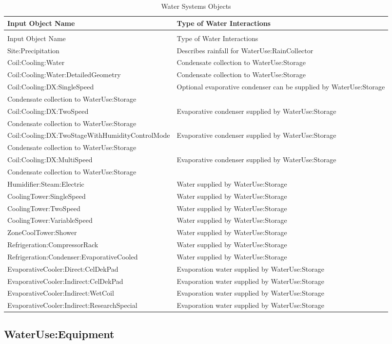 \begin{longtable}[c]{p{2.49in}p{3.5in}}
\caption{Water Systems Objects \label{table:water-systems-objects}} \tabularnewline
\toprule
Input Object Name & Type of Water Interactions \tabularnewline
\midrule
\endfirsthead

\caption[]{Water Systems Objects} \tabularnewline
\toprule
Input Object Name & Type of Water Interactions \tabularnewline
\midrule
\endhead

Site:Precipitation & Describes rainfall for WaterUse:RainCollector \tabularnewline
Coil:Cooling:Water & Condensate collection to WaterUse:Storage \tabularnewline
Coil:Cooling:Water:DetailedGeometry & Condensate collection to WaterUse:Storage \tabularnewline
Coil:Cooling:DX:SingleSpeed & Optional evaporative condenser can be supplied by WaterUse:Storage \tabularnewline
Condensate collection to WaterUse:Storage \tabularnewline
Coil:Cooling:DX:TwoSpeed & Evaporative condenser supplied by WaterUse:Storage \tabularnewline
Condensate collection to WaterUse:Storage \tabularnewline
Coil:Cooling:DX:TwoStageWithHumidityControlMode & Evaporative condenser supplied by WaterUse:Storage \tabularnewline
Condensate collection to WaterUse:Storage \tabularnewline
Coil:Cooling:DX:MultiSpeed & Evaporative condenser supplied by WaterUse:Storage \tabularnewline
Condensate collection to WaterUse:Storage \tabularnewline
Humidifier:Steam:Electric & Water supplied by WaterUse:Storage \tabularnewline
CoolingTower:SingleSpeed & Water supplied by WaterUse:Storage \tabularnewline
CoolingTower:TwoSpeed & Water supplied by WaterUse:Storage \tabularnewline
CoolingTower:VariableSpeed & Water supplied by WaterUse:Storage \tabularnewline
ZoneCoolTower:Shower & Water supplied by WaterUse:Storage \tabularnewline
Refrigeration:CompressorRack & Water supplied by WaterUse:Storage \tabularnewline
Refrigeration:Condenser:EvaporativeCooled & Water supplied by WaterUse:Storage \tabularnewline
EvaporativeCooler:Direct:CelDekPad & Evaporation water supplied by WaterUse:Storage \tabularnewline
EvaporativeCooler:Indirect:CelDekPad & Evaporation water supplied by WaterUse:Storage \tabularnewline
EvaporativeCooler:Indirect:WetCoil & Evaporation water supplied by WaterUse:Storage \tabularnewline
EvaporativeCooler:Indirect:ResearchSpecial & Evaporation water supplied by WaterUse:Storage \tabularnewline
\bottomrule
\end{longtable}

\subsection{WaterUse:Equipment}\label{wateruseequipment}

